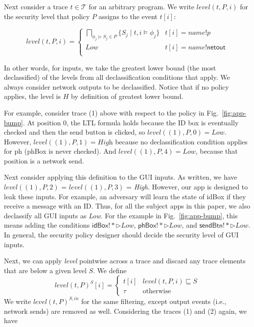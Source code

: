 \documentclass{llncs}
\newcommand{\code}[1]{\textsf{#1}} %
\newcommand{\aset}[1]{\{#1\}}
\newcommand{\sch}{\textit{name}}
\newcommand{\tr}{t\xspace}
\newcommand{\tset}{\ensuremath{\mathcal{T}}\xspace}
\newcommand{\tlevel}[3]{\textit{level}(#1, #2, #3)}
\newcommand{\tleveltr}[2]{\textit{level}(#1, #2)}
\begin{document}
Next consider a trace $\tr \in \tset$ for an arbitrary program.
We write $\tlevel{\tr}{P}{i}$ for the security level that policy
$P$ assigns to the event $\tr[i]$:

\begin{displaymath}
  \tlevel{\tr}{P}{i} =
  \begin{cases}
    \bigsqcap_{\phi_j\rhd S_j \in P} \aset{ S_j \mid \tr, i \models
      \phi_j } & \tr[i] = \sch!p \\
    \textit{Low} & \tr[i] = \sch!\code{netout} \\
  \end{cases}
\end{displaymath}

In other words, for inputs, we take the greatest lower bound (the most
declassified) of the levels from all declassification conditions that
apply. We always consider network outputs to be
declassified. Notice that if no policy applies, the level is $H$ by
definition of greatest lower bound.

For example, consider trace (1) above with
respect to the policy in Fig.~\ref{fig:app-bump}.  At position 0, the
LTL formula holds because the ID box is eventually checked and then
the send button is clicked, so $\tlevel{(1)}{P}{0} =
\textit{Low}$. However,
$\tlevel{(1)}{P}{1} = \textit{High}$ because no
declassification condition applies for \code{ph}
(\code{phBox} is never checked). And $\tlevel{(1)}{P}{4} =
\textit{Low}$, because that position is a network send.

Next consider applying this definition to the GUI inputs. As written,
we have $\tlevel{(1)}{P}{2}$ = $\tlevel{(1)}{P}{3}$ =
\textit{High}. However, our app is designed to leak these inputs. 
For example, an adversary will learn the state of
\code{idBox} if they receive a message with an ID. Thus,
for all the subject apps in this paper, we also declassify all GUI inputs as
\textit{Low}. 
For the example in Fig.~\ref{fig:app-bump}, this means
adding the conditions
$\code{idBox!}\ast \rhd \textit{Low}$,
$\code{phBox!}\ast \rhd \textit{Low}$, and
$\code{sendBtn!}\ast \rhd \textit{Low}$. In general, 
the security policy designer should decide the security level of GUI inputs.

Next, we can apply \textit{level} pointwise across a trace and discard
any trace elements that are below a given level $S$. We define
\begin{displaymath}
\tleveltr{\tr}{P}^S[i] =
\begin{cases}
\tr[i] & \tlevel{\tr}{P}{i} \sqsubseteq S \\
\tau & \textrm{otherwise}
\end{cases}
\end{displaymath}
We write $\tleveltr{\tr}{P}^{S,in}$ for the same filtering, except
output events (i.e., network sends) are removed as well.
%
Considering the traces (1) and (2) again, we have
\end{document}
